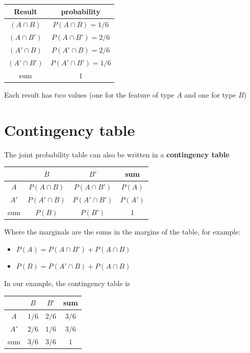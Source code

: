 \documentclass[
]{book}
\providecommand{\tightlist}{%
  \setlength{\itemsep}{0pt}\setlength{\parskip}{0pt}}
\begin{document}
\begin{longtable}[]{@{}cc@{}}
\toprule
Result & probability \\
\midrule
\endhead
\((A\cap B)\) & \(P(A \cap B)=1/6\) \\
\((A\cap B')\) & \(P(A \cap B')=2/6\) \\
\((A'\cap B)\) & \(P(A' \cap B)=2/6\) \\
\((A'\cap B')\) & \(P(A' \cap B')=1/6\) \\
sum & \(1\) \\
\bottomrule
\end{longtable}

Each result has \(two\) values (one for the feature of type \(A\) and one for type \(B\))

\hypertarget{contingency-table}{%
\section{Contingency table}\label{contingency-table}}

The joint probability table can also be written in a \textbf{contingency table}

\begin{longtable}[]{@{}cccc@{}}
\toprule
& \(B\) & \(B'\) & sum \\
\midrule
\endhead
\(A\) & \(P(A \cap B )\) & \(P(A\cap B' )\) & \(P(A)\) \\
\(A'\) & \(P(A'\cap B )\) & \(P(A'\cap B' )\) & \(P(A')\) \\
sum & \(P(B)\) & \(P(B')\) & 1 \\
\bottomrule
\end{longtable}

Where the marginals are the sums in the margins of the table, for example:

\begin{itemize}
\tightlist
\item
  \(P(A)=P(A \cap B') + P(A \cap B)\)
\item
  \(P(B)=P(A' \cap B) +P(A \cap B)\)
\end{itemize}

In our example, the contingency table is

\begin{longtable}[]{@{}cccc@{}}
\toprule
& \(B\) & \(B'\) & sum \\
\midrule
\endhead
\(A\) & \(1/6\) & \(2/6\) & \(3/6\) \\
\(A'\) & \(2/6\) & \(1/6\) & \(3/6\) \\
sum & \(3/6\) & \(3/6\) & \(1\) \\
\bottomrule
\end{longtable}
\end{document}
